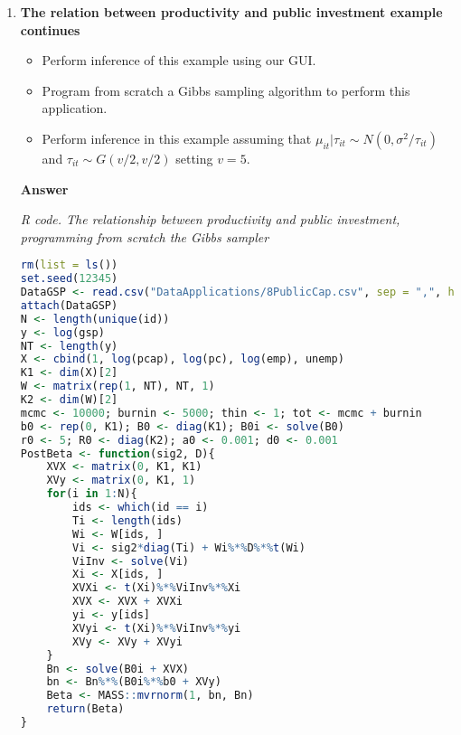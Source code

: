 \begin{enumerate}[leftmargin=*]
	\item \textbf{The relation between productivity and public investment example continues}

\begin{itemize}
	\item Perform inference of this example using our GUI.
	\item Program from scratch a Gibbs sampling algorithm to perform this application.
	\item Perform inference in this example assuming that $\mu_{it}|\tau_{it}\sim N(0, \sigma^2/\tau_{it})$ and $\tau_{it}\sim G(v/2,v/2)$ setting $v=5$. 
\end{itemize}

\textbf{Answer}
\begin{tcolorbox}[enhanced,width=4.67in,center upper,
	fontupper=\large\bfseries,drop shadow southwest,sharp corners]
	\textit{R code. The relationship between productivity and public investment, programming from scratch the Gibbs sampler}
	\begin{VF}
		\begin{lstlisting}[language=R]
rm(list = ls())
set.seed(12345)
DataGSP <- read.csv("DataApplications/8PublicCap.csv", sep = ",", header = TRUE, fileEncoding = "latin1")
attach(DataGSP)
N <- length(unique(id))
y <- log(gsp)
NT <- length(y)
X <- cbind(1, log(pcap), log(pc), log(emp), unemp)
K1 <- dim(X)[2]
W <- matrix(rep(1, NT), NT, 1)
K2 <- dim(W)[2]
mcmc <- 10000; burnin <- 5000; thin <- 1; tot <- mcmc + burnin
b0 <- rep(0, K1); B0 <- diag(K1); B0i <- solve(B0) 
r0 <- 5; R0 <- diag(K2); a0 <- 0.001; d0 <- 0.001
PostBeta <- function(sig2, D){
	XVX <- matrix(0, K1, K1)
	XVy <- matrix(0, K1, 1)
	for(i in 1:N){
		ids <- which(id == i)
		Ti <- length(ids)
		Wi <- W[ids, ]
		Vi <- sig2*diag(Ti) + Wi%*%D%*%t(Wi)
		ViInv <- solve(Vi)
		Xi <- X[ids, ]
		XVXi <- t(Xi)%*%ViInv%*%Xi
		XVX <- XVX + XVXi
		yi <- y[ids]
		XVyi <- t(Xi)%*%ViInv%*%yi
		XVy <- XVy + XVyi
	}
	Bn <- solve(B0i + XVX)
	bn <- Bn%*%(B0i%*%b0 + XVy)
	Beta <- MASS::mvrnorm(1, bn, Bn)
	return(Beta)
}\end{lstlisting}
	\end{VF}
\end{tcolorbox}



\end{enumerate}
